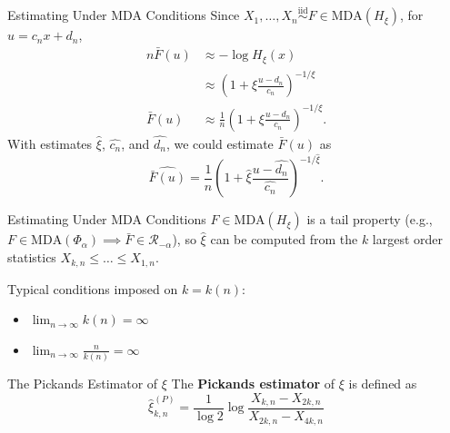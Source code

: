 \documentclass{beamer}
\newcommand{\MDA}{\text{MDA}}
\begin{document}
\begin{frame}{Estimating Under MDA Conditions}
    Since $X_1, \ldots, X_n \overset{\text{iid}}{\sim} F \in \MDA(H_{\xi})$, for $u = c_n x + d_n$,
    \begin{align*}
        n\bar{F}(u) &\approx -\log H_{\xi}(x) \\
        &\approx \left(1 + \xi\frac{u - d_n}{c_n}\right)^{-1 / \xi} \\
        \bar{F}(u) &\approx \frac{1}{n}\left(1 + \xi\frac{u - d_n}{c_n}\right)^{-1 / \xi}.
    \end{align*}
    With estimates $\hat{\xi}$, $\hat{c_n}$, and $\hat{d_n}$, we could estimate $\bar{F}(u)$ as
    \[
    \widehat{\bar{F}(u)} = \frac{1}{n}\left(1 + \hat{\xi}\frac{u - \hat{d_n}}{\hat{c_n}}\right)^{-1 / \hat{\xi}}.
    \]
\end{frame}

\begin{frame}{Estimating Under MDA Conditions}
    $F \in \MDA(H_{\xi})$ is a tail property (e.g., $F \in \MDA(\Phi_{\alpha}) \implies \bar{F} \in \mathcal{R}_{-\alpha}$), so $\hat{\xi}$ can be computed from the $k$ largest order statistics $X_{k, n} \le \ldots \le X_{1, n}$.

    \medskip

    Typical conditions imposed on $k = k(n)$:
    \begin{itemize}
        \item $\lim_{n \to \infty} k(n) = \infty$
        \item $\lim_{n \to \infty} \frac{n}{k(n)} = \infty$
    \end{itemize}
\end{frame}

\begin{frame}{The Pickands Estimator of $\xi$}
    The \textbf{Pickands estimator} of $\xi$ is defined as
    \[
    \hat{\xi}_{k, n}^{(P)} = \frac{1}{\log 2}\log\frac{X_{k, n} - X_{2 k, n}}{X_{2 k, n} - X_{4 k, n}}
    \]
\end{frame}
\end{document}
